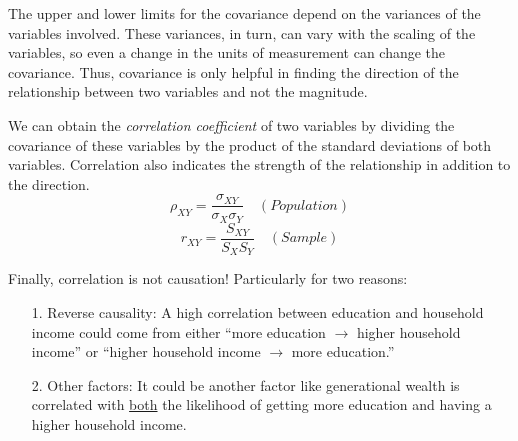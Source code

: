 \documentclass{./../../Latex/handout}
\begin{document}
The upper and lower limits for the covariance depend on the variances of the variables involved. These variances, in turn, can vary with the scaling of the variables, so even a change in the units of measurement can change the covariance. Thus, covariance is only helpful in finding the direction of the relationship between two variables and not the magnitude. 

We can obtain the \textit{correlation coefficient} of two variables by dividing the covariance of these variables by the product of the standard deviations of both variables. Correlation also indicates the strength of the relationship in addition to the direction.
$$ \rho_{XY} = \frac{ \sigma_{XY}}{\sigma_X \sigma_Y}  \quad (Population) $$
$$ r_{XY} = \frac{ S_{XY}}{S_X S_Y} \quad (Sample) $$

\vspace{1em}

Finally, correlation is not causation! Particularly for two reasons:
\begin{itemize}
\item[1.] Reverse causality: A high correlation between education and household income could come from either ``more education $\rightarrow$ higher household income'' or ``higher household income $\rightarrow$ more education.''
\item[2.] Other factors: It could be another factor like generational wealth is correlated with \underline{both} the likelihood of getting more education and having a higher household income. 
	
\end{itemize}
\end{document}
